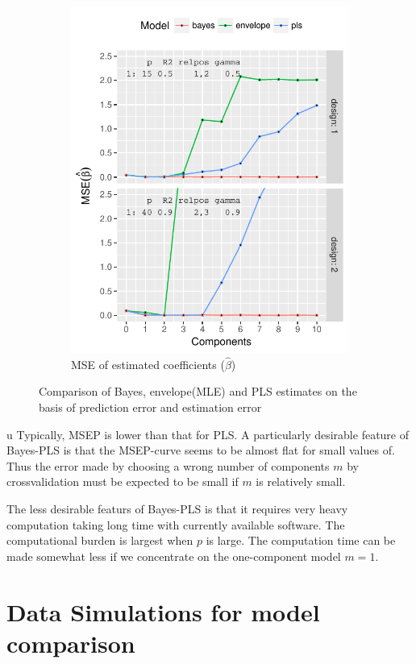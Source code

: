 \documentclass[a4paper, 11pt]{article}
\begin{document}
\begin{figure}[H]
\begin{subfigure}[b]{0.5\textwidth}
    \includegraphics[width=\textwidth]{../pdf/est-error-plot.pdf}
    \caption{MSE of estimated coefficients ($\hat{\beta}$)}
    \label{fig:mse_beta}
  \end{subfigure}
  \caption{Comparison of Bayes, envelope(MLE) and PLS estimates on the basis of
    prediction error and estimation error}
\end{figure}

u Typically, MSEP is lower than that for PLS. A particularly desirable feature of Bayes-PLS is that the MSEP-curve seems to be almost flat for small values of. Thus the error made by choosing a wrong number of components $m$ by crossvalidation must be expected to be small if $m$ is relatively small.

The less desirable featurs of Bayes-PLS is that it requires very heavy computation taking long time with currently available software. The computational burden is largest when $p$ is large. The computation time can be made somewhat  less if we concentrate on the one-component model $m=1$.

\section{Data Simulations for model comparison}
\end{document}
